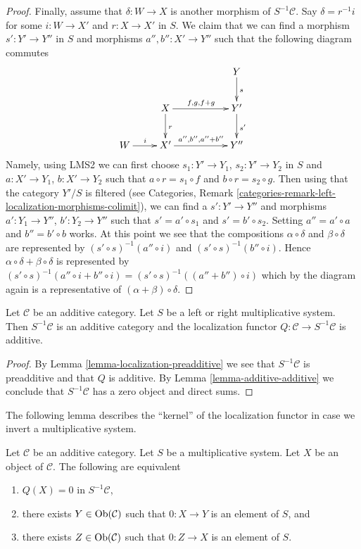 \begin{proof}
\medskip\noindent
Finally, assume that $\delta : W \to X$ is another morphism of
$S^{-1}\mathcal{C}$. Say $\delta = r^{-1}i$ for some
$i : W \to X'$ and $r : X \to X'$ in $S$. We claim that we can find
a morphism $s' : Y' \to Y''$ in $S$ and morphisms $a'', b'' : X' \to Y''$
such that the following diagram commutes
$$
\xymatrix{
& & & Y \ar[d]^s \\
& X \ar[rr]^{f, g, f + g} \ar[d]^r & & Y' \ar[d]^{s'} \\
W \ar[r]^i & X' \ar[rr]^{a'', b'', a'' + b''} & & Y''
}
$$
Namely, using LMS2 we can first choose
$s_1 : Y' \to Y_1$, $s_2 : Y' \to Y_2$ in $S$ and
$a : X' \to Y_1$, $b : X' \to Y_2$ such that
$a \circ r = s_1 \circ f$ and $b \circ r = s_2 \circ g$.
Then using that the category $Y'/S$ is filtered (see
Categories, Remark \ref{categories-remark-left-localization-morphisms-colimit}),
we can
find a $s' : Y' \to Y''$ and morphisms $a' : Y_1 \to Y''$, $b' : Y_2 \to Y''$
such that $s' = a' \circ s_1$ and $s' = b' \circ s_2$. Setting
$a'' = a' \circ a$ and $b'' = b' \circ b$ works.
At this point we see that the compositions
$\alpha \circ \delta$ and $\beta \circ \delta$ are represented by
$(s' \circ s)^{-1}(a'' \circ i)$ and $(s' \circ s)^{-1}(b'' \circ i)$.
Hence $\alpha \circ \delta + \beta \circ \delta$ is represented
by $(s' \circ s)^{-1}(a'' \circ i + b'' \circ i) =
(s' \circ s)^{-1}((a'' + b'') \circ i)$
which by the diagram again is a representative
of $(\alpha + \beta) \circ \delta$.
\end{proof}

\begin{lemma}
\label{lemma-localization-additive}
Let $\mathcal{C}$ be an additive category.
Let $S$ be a left or right multiplicative system.
Then $S^{-1}\mathcal{C}$ is an additive category and the localization functor
$Q : \mathcal{C} \to S^{-1}\mathcal{C}$ is additive.
\end{lemma}

\begin{proof}
By Lemma \ref{lemma-localization-preadditive}
we see that $S^{-1}\mathcal{C}$ is preadditive and that $Q$ is additive.
By Lemma \ref{lemma-additive-additive} we conclude that $S^{-1}\mathcal{C}$
has a zero object and direct sums.
\end{proof}

\noindent
The following lemma describes the ``kernel''
of the localization functor in case we invert a multiplicative system.

\begin{lemma}
\label{lemma-kernel-localization}
Let $\mathcal{C}$ be an additive category. Let $S$ be a multiplicative
system. Let $X$ be an object
of $\mathcal{C}$. The following are equivalent
\begin{enumerate}
\item $Q(X) = 0$ in $S^{-1}\mathcal{C}$,
\item there exists $Y \in \mathop{\mathrm{Ob}}\nolimits(\mathcal{C})$ such that
$0 : X \to Y$ is an element of $S$, and
\item there exists $Z \in \mathop{\mathrm{Ob}}\nolimits(\mathcal{C})$ such that
$0 : Z \to X$ is an element of $S$.
\end{enumerate}
\end{lemma}

